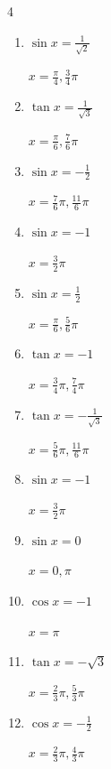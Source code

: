 \begin{multicols}{4}
\begin{enumerate}
  \item $\displaystyle \sin{x}  = \frac{1}{\sqrt{2}}$

        $\displaystyle x = \frac{\pi}{4} , \frac{3}{4}\pi$

  \item $\displaystyle \tan{x}  = \frac{1}{\sqrt{3}}$

        $\displaystyle x = \frac{\pi}{6} , \frac{7}{6}\pi$

  \item $\displaystyle \sin{x}  = -\frac{1}{2}$

        $\displaystyle x = \frac{7}{6}\pi , \frac{11}{6}\pi$

  \item $\displaystyle \sin{x}  = -1$

        $\displaystyle x = \frac{3}{2}\pi$

  \item $\displaystyle \sin{x}  = \frac{1}{2}$

        $\displaystyle x = \frac{\pi}{6} , \frac{5}{6}\pi$

\columnbreak %

  \item $\displaystyle \tan{x}  = -1$

        $\displaystyle x = \frac{3}{4}\pi , \frac{7}{4}\pi$

  \item $\displaystyle \tan{x}  = -\frac{1}{\sqrt{3}}$

        $\displaystyle x = \frac{5}{6}\pi , \frac{11}{6}\pi$

  \item $\displaystyle \sin{x}  = -1$

        $\displaystyle x = \frac{3}{2}\pi$

  \item $\displaystyle \sin{x}  = 0$

        $\displaystyle x = 0 , \pi$

  \item $\displaystyle \cos{x}  = -1$

        $\displaystyle x = \pi$

  \item $\displaystyle \tan{x}  = -\sqrt{3}$

        $\displaystyle x = \frac{2}{3}\pi , \frac{5}{3}\pi$

  \item $\displaystyle \cos{x}  = -\frac{1}{2}$

        $\displaystyle x = \frac{2}{3}\pi , \frac{4}{3}\pi$


\end{enumerate}
\end{multicols}
